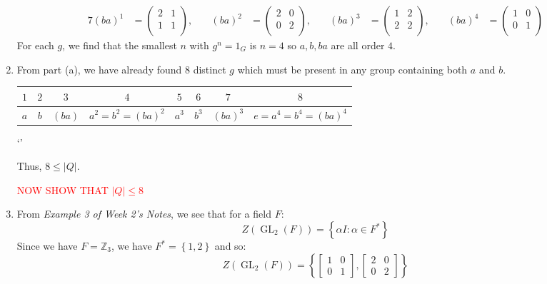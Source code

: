 \documentclass[a4paper, 11pt]{article}
\newcommand{\ZZ}{\mathbb{Z}}
\def\set#1{\left\{ #1 \right\}}
\begin{document}
\begin{enumerate}[label=(\alph*)]
\begin{alignat*}{7}
	(ba)^1&=\begin{pmatrix}
		2 & 1 \\
		1 & 1 \\
	\end{pmatrix},\quad
	&(ba)^2&=\begin{pmatrix}
		2 & 0 \\
		0 & 2 \\
	\end{pmatrix},\quad
	&(ba)^3&=\begin{pmatrix}
		1 & 2 \\
		2 & 2 \\
	\end{pmatrix},\quad
	&(ba)^4&=\begin{pmatrix}
		1 & 0 \\
		0 & 1 \\
	\end{pmatrix}
	\end{alignat*}
	For each $g$, we find that the smallest $n$ with $g^n=1_G$ is $n=4$ so $a,b,ba$ are all order $4$.

	\item From part (a), we have already found $8$ distinct $g$ which must be present in any group containing both $a$ and $b$.
	
	\begin{center}
		\begin{tabular}{|c|c|c|c|c|c|c|c|}
			\toprule
			$1$ & $2$ & $3$ & $4$ & $5$ & $6$ & $7$ & $8$ \\
			\midrule 
			$a$ & 
			$b$ & 
			$(ba)$ & 
			$a^2=b^2=(ba)^2$ & 
			$a^3$ &
			$b^3$ &
			$(ba)^3$ &
			$e=a^4=b^4=(ba)^4$ \\
			\bottomrule
		\end{tabular}`'
	\end{center}

	Thus, $8\leq|Q|$. 
	
	\textcolor{red}{NOW SHOW THAT $|Q|\leq8$}






	\item From \textit{Example 3 of Week 2's Notes}, we see that for a field $F$: 
	\[
		Z(\operatorname{GL}_2(F)) = 
		\set{
			\alpha I : \alpha \in F^*
		}
	\] 
	Since we have $F=\ZZ_3$, we have $F^*=\set{1,2}$ and so: 
	\[
		Z(\operatorname{GL}_2(F))=\set{
			\begin{bmatrix}
				1 & 0 \\ 
				0 & 1
			\end{bmatrix},
			\begin{bmatrix}
				2 & 0 \\
				0 & 2 
			\end{bmatrix}
		}
	\]


\end{enumerate}
\end{document}
